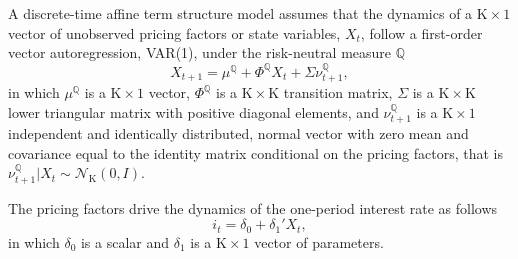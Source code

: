 \documentclass[a4paper, 12pt]{article}
\providecommand{\idxt}{t}
\providecommand{\srate}{i}
\providecommand{\shortrate}{\srate_{\idxt}}
\providecommand{\Xvars}{X_{\idxt}}
\providecommand{\XvarsFwd}{X_{\idxt+1}}
\providecommand{\Xdim}{\mathrm{K}}
\providecommand{\Normal}{\mathcal{N}}
\providecommand{\Qmeasure}{\mathbb{Q}}
\providecommand{\deltazero}{\delta_{0}}
\providecommand{\deltaone}{\delta_{1}}
\providecommand{\error}{\nu_{t+1}}
\providecommand{\errorQ}{\error^{\Qmeasure}}
\providecommand{\XmuQ}{\mu^{\Qmeasure}}
\providecommand{\XSigma}{\Sigma}
\providecommand{\XPhiQ}{\Phi^{\Qmeasure}}
\newcommand{\eqXvarsFwdQ}{\XvarsFwd = \XmuQ + \XPhiQ \Xvars  + \XSigma \errorQ}
\newcommand{\eqshortrate}{\shortrate = \deltazero + \deltaone' \Xvars}
\begin{document}
A discrete-time affine term structure model assumes that the dynamics of a \(\Xdim \times 1\) vector of unobserved pricing factors or state variables, \(\Xvars\), follow a first-order vector autoregression, VAR(1), under the risk-neutral measure \(\Qmeasure\)
\begin{equation} \label{eq:nXvarsQ}
\eqXvarsFwdQ ,
\end{equation}
in which \(\XmuQ\) is a \(\Xdim \times 1\) vector, \(\XPhiQ\) is a \(\Xdim \times \Xdim\) transition matrix, \(\XSigma\) is a \(\Xdim \times \Xdim\) lower triangular matrix with positive diagonal elements, and \(\errorQ\) is a \(\Xdim \times 1\) independent and identically distributed, normal vector with zero mean and covariance equal to the identity matrix conditional on the pricing factors, that is \(\error^{\Qmeasure} | \Xvars \sim \Normal_{\Xdim} \left(0,I\right)\). 

The pricing factors drive the dynamics of the one-period interest rate as follows 
\begin{equation} \label{eq:nShortRate}
\eqshortrate ,
\end{equation}
in which \(\deltazero\) is a scalar and \(\deltaone\) is a \(\Xdim \times 1\) vector of parameters.
\end{document}
